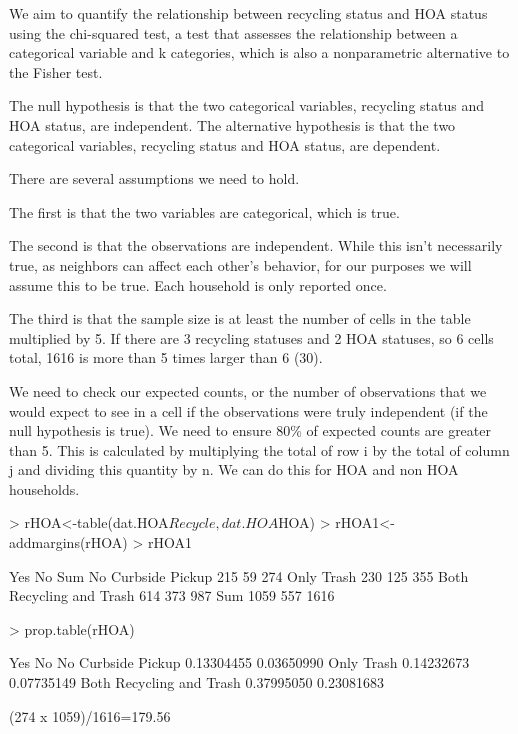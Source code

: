 \documentclass{article}
\begin{document}
We aim to quantify the relationship between recycling status and HOA status using the chi-squared test, a test that assesses the relationship between a categorical variable and k categories, which is also a nonparametric alternative to the Fisher test.

The null hypothesis is that the two categorical variables, recycling status and HOA status, are independent.
The alternative hypothesis is that the two categorical variables, recycling status and HOA status, are dependent. 

There are several assumptions we need to hold. 

The first is that the two variables are categorical, which is true.

The second is that the observations are independent. While this isn't necessarily true, as neighbors can affect each other's behavior, for our purposes we will assume this to be true. Each household is only reported once. 

The third is that the sample size is at least the number of cells in the table multiplied by 5. If there are 3 recycling statuses and 2 HOA statuses, so 6 cells total, 1616 is more than 5 times larger than 6 (30). 

We need to check our expected counts, or the number of observations that we would expect to see in a cell if the observations were truly independent (if the null hypothesis is true). We need to ensure 80\% of expected counts are greater than 5. This is calculated by multiplying the total of row i by the total of column j and dividing this quantity by n. We can do this for HOA and non HOA households. 

\begin{Schunk}
\begin{Sinput}
> rHOA<-table(dat.HOA$Recycle,dat.HOA$HOA)
> rHOA1<-addmargins(rHOA)
> rHOA1
\end{Sinput}
\begin{Soutput}
                            Yes   No  Sum
  No Curbside Pickup        215   59  274
  Only Trash                230  125  355
  Both Recycling and Trash  614  373  987
  Sum                      1059  557 1616
\end{Soutput}
\begin{Sinput}
> prop.table(rHOA)
\end{Sinput}
\begin{Soutput}
                                  Yes         No
  No Curbside Pickup       0.13304455 0.03650990
  Only Trash               0.14232673 0.07735149
  Both Recycling and Trash 0.37995050 0.23081683
\end{Soutput}
\end{Schunk}
(274 x 1059)/1616=179.56
\end{document}
